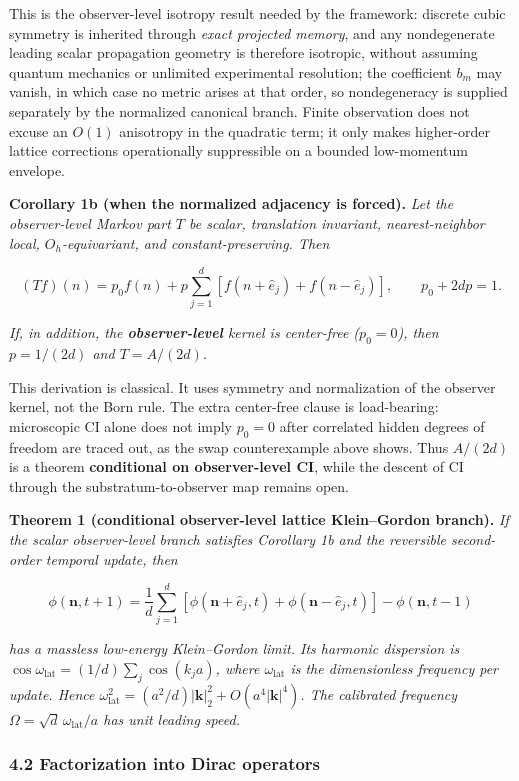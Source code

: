 \documentclass[
]{article}
\begin{document}
This is the observer-level isotropy result needed by the framework:
discrete cubic symmetry is inherited through \emph{exact projected
memory}, and any nondegenerate leading scalar propagation geometry is
therefore isotropic, without assuming quantum mechanics or unlimited
experimental resolution; the coefficient \(b_m\) may vanish, in which
case no metric arises at that order, so nondegeneracy is supplied
separately by the normalized canonical branch. Finite observation does
not excuse an \(O(1)\) anisotropy in the quadratic term; it only makes
higher-order lattice corrections operationally suppressible on a bounded
low-momentum envelope.

\textbf{Corollary 1b (when the normalized adjacency is forced).}
\emph{Let the observer-level Markov part \(T\) be scalar, translation
invariant, nearest-neighbor local, \(O_h\)-equivariant, and
constant-preserving. Then}

\[(Tf)(n)=p_0f(n)+p\sum_{j=1}^d[f(n+\hat e_j)+f(n-\hat e_j)],\qquad p_0+2dp=1.\]

\emph{If, in addition, the \textbf{observer-level} kernel is center-free
(\(p_0=0\)), then \(p=1/(2d)\) and \(T=A/(2d)\).}

This derivation is classical. It uses symmetry and normalization of the
observer kernel, not the Born rule. The extra center-free clause is
load-bearing: microscopic CI alone does not imply \(p_0=0\) after
correlated hidden degrees of freedom are traced out, as the swap
counterexample above shows. Thus \(A/(2d)\) is a theorem
\textbf{conditional on observer-level CI}, while the descent of CI
through the substratum-to-observer map remains open.

\textbf{Theorem 1 (conditional observer-level lattice Klein--Gordon
branch).} \emph{If the scalar observer-level branch satisfies Corollary
1b and the reversible second-order temporal update, then}

\[\phi(\mathbf n,t+1)=\frac1d\sum_{j=1}^d[\phi(\mathbf n+\hat e_j,t)+\phi(\mathbf n-\hat e_j,t)]-\phi(\mathbf n,t-1)\]

\emph{has a massless low-energy Klein--Gordon limit. Its harmonic
dispersion is \(\cos\omega_{\mathrm{lat}}=(1/d)\sum_j\cos(k_ja)\), where
\(\omega_{\mathrm{lat}}\) is the dimensionless frequency per update.
Hence
\(\omega_{\mathrm{lat}}^2=(a^2/d)|\mathbf k|_2^2+O(a^4|\mathbf k|^4)\).
The calibrated frequency \(\Omega=\sqrt d\,\omega_{\mathrm{lat}}/a\) has
unit leading speed.}

\hypertarget{factorization-into-dirac-operators}{%
\subsubsection{4.2 Factorization into Dirac
operators}\label{factorization-into-dirac-operators}}
\end{document}
